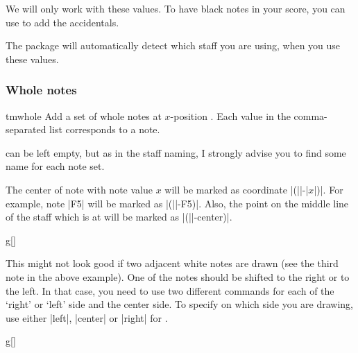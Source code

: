 \documentclass[11pt,a4paper]{ltxdoc}
\begin{document}
We will only work with these values. To have black notes in your score, you can 
use  to add the accidentals.

The package will automatically detect which staff you are using, when you use 
these values.

\subsubsection{Whole notes}\label{sec:music-notes:commands:whole}
\begin{docCommand}{tmwhole}{}
  Add a set of whole notes at $x$-position . Each value in the 
  comma-separated list  corresponds to a note.

   can be left empty, but as in the staff naming, I strongly advise 
  you to find some name for each note set.

  The center of note with note value $x$ will be marked as coordinate 
  |(||-|$x$|)|. For example, note |F5| will be marked as 
  |(||-F5)|. Also, the point on the middle line of the staff which is 
  at  will be marked as |(||-center)|.
\end{docCommand}
\begin{dispExample}
\begin{tmsinglestaff}
  \begin{tmstaff}{g}[]
  \end{tmstaff}
\end{tmsinglestaff}
\end{dispExample}

This might not look good if two adjacent white notes are drawn (see the third 
note in the above example). One of the notes should be shifted to the right or 
to the left. In that case, you need to use two different  
commands for each of the `right' or `left' side and the center side. To specify 
on which side you are drawing, use either |left|, |center| or |right| for 
.

\begin{dispExample}
\begin{tmsinglestaff}
  \begin{tmstaff}{g}[]
  \end{tmstaff}
\end{tmsinglestaff}
\end{dispExample}
\end{document}
